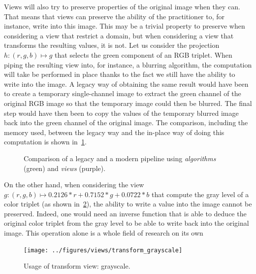 Views will also try to preserve properties of the original image when they can. That means that views can preserve the
ability of the practitioner to, for instance, write into this image. This may be a trivial property to preserve when
considering a view that restrict a domain, but when considering a view that transforms the resulting values, it is not.
Let us consider the projection \(h: (r,g,b) \mapsto g\) that selects the green component of an RGB triplet. When piping
the resulting view into, for instance, a blurring algorithm, the computation will take be performed in place thanks to
the fact we still have the ability to write into the image. A legacy way of obtaining the same result would have been to
create a temporary single-channel image to extract the green channel of the original RGB image so that the temporary
image could then be blurred. The final step would have then been to copy the values of the temporary blurred image back
into the green channel of the original image. The comparison, including the memory used, between the legacy way and the
in-place way of doing this computation is shown in~\cref{fig:legacy.vs.view}.

\begin{figure}[htbp]
  \centering
  \hfil

  \caption{Comparison of a legacy and a modern pipeline using \emph{algorithms} (green) and \emph{views} (purple).}
  \label{fig:legacy.vs.view}
\end{figure}

On the other hand, when considering the view \(g: (r,g,b) \mapsto 0.2126*r+0.7152*g+0.0722*b\) that compute the gray
level of a color triplet (as shown in~\cref{fig:view.grayscale}), the ability to write a value into the image cannot be
preserved. Indeed, one would need an inverse function that is able to deduce the original color triplet from the gray
level to be able to write back into the original image. This operation alone is a whole field of research on its
own~\parencite{zhang.2016.colorful,levin.2004.colorization,welsh.2002.transferring}

\begin{figure}[htbp]
  \centering
  \texttt{[image: ../figures/views/transform\_grayscale]}
  \caption{Usage of transform view: grayscale.}
  \label{fig:view.grayscale}
\end{figure}

